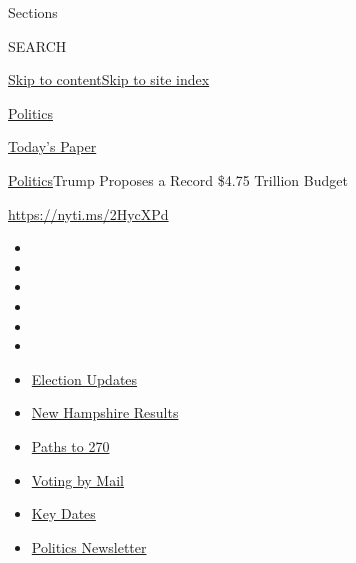 Sections

SEARCH

\protect\hyperlink{site-content}{Skip to
content}\protect\hyperlink{site-index}{Skip to site index}

\href{https://www.nytimes3xbfgragh.onion/section/politics}{Politics}

\href{https://myaccount.nytimes3xbfgragh.onion/auth/login?response_type=cookie\&client_id=vi}{}

\href{https://www.nytimes3xbfgragh.onion/section/todayspaper}{Today's
Paper}

\href{/section/politics}{Politics}\textbar{}Trump Proposes a Record
\$4.75 Trillion Budget

\url{https://nyti.ms/2HycXPd}

\begin{itemize}
\item
\item
\item
\item
\item
\item
\end{itemize}

\begin{itemize}
\item
  \href{https://www.nytimes3xbfgragh.onion/live/2020/09/09/us/trump-vs-biden?action=click\&pgtype=Article\&state=default\&region=TOP_BANNER\&context=storylines_menu}{Election
  Updates}
\item
  \href{https://www.nytimes3xbfgragh.onion/interactive/2020/09/08/us/elections/results-new-hampshire-primary-elections.html?action=click\&pgtype=Article\&state=default\&region=TOP_BANNER\&context=storylines_menu}{New
  Hampshire Results}
\item
  \href{https://www.nytimes3xbfgragh.onion/interactive/2020/us/elections/election-states-biden-trump.html?action=click\&pgtype=Article\&state=default\&region=TOP_BANNER\&context=storylines_menu}{Paths
  to 270}
\item
  \href{https://www.nytimes3xbfgragh.onion/interactive/2020/08/31/us/politics/vote-by-mail-deadlines.html?action=click\&pgtype=Article\&state=default\&region=TOP_BANNER\&context=storylines_menu}{Voting
  by Mail}
\item
  \href{https://www.nytimes3xbfgragh.onion/interactive/2019/us/elections/2020-presidential-election-calendar.html?action=click\&pgtype=Article\&state=default\&region=TOP_BANNER\&context=storylines_menu}{Key
  Dates}
\item
  \href{https://www.nytimes3xbfgragh.onion/newsletters/politics?action=click\&pgtype=Article\&state=default\&region=TOP_BANNER\&context=storylines_menu}{Politics
  Newsletter}
\end{itemize}

